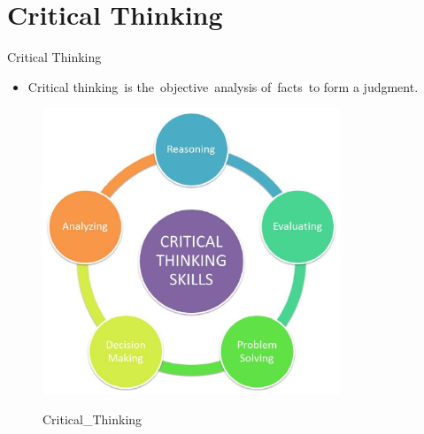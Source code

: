 \documentclass[
 size=14pt,
 paper=smartboard,  %
 mode=present, 		%
 display=slides, 	%
 style=tuliplab,  	%
 pauseslide,
 fleqn,leqno]{powerdot}{}
\begin{document}
\section{Critical Thinking}

\begin{slide}[toc=,bm=]{Critical Thinking}

\begin{itemize}
  \item Critical thinking is the objective analysis of facts to form a judgment.
\end{itemize}

\begin{figure}
  \centering
  \includegraphics[width=3.5in]{figures/Critical_Thinking.eps}\\
  \caption{Critical_Thinking}
\end{figure}

\end{slide}
\end{document}
